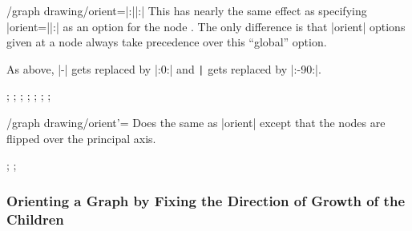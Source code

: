 \begin{key}{/graph drawing/orient=|:||:|}
  This has nearly the same effect as specifying
  |orient=||:| as an option for the node
  . The only difference is that |orient| options given at
  a node always take precedence over this ``global'' option.

  As above, |-| gets replaced by
  |:0:| and \verb!|!
  gets replaced by |:-90:|.
\begin{codeexample}[]
\tikz {};
\tikz {};
\tikz {};
\tikz {};
\tikz {};
\tikz {};
\tikz {};
\end{codeexample}
\end{key}

\begin{key}{/graph drawing/orient'=}
  Does the same as |orient| except that the nodes are flipped over the
  principal axis.
\begin{codeexample}[]
\tikz {};
\tikz {};
\end{codeexample}
\end{key}



\subsubsection{Orienting a Graph by Fixing the Direction of Growth of the Children}

